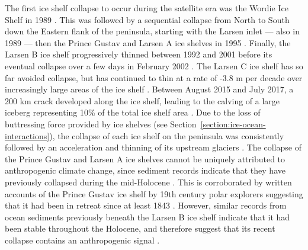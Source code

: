 The first ice shelf collapse to occur during the satellite era was the Wordie Ice Shelf in 1989 \citep{doakeRapidDisintegrationWordie1991}. This was followed by a sequential collapse from North to South down the Eastern flank of the peninsula, starting with the Larsen inlet --- also in 1989 --- then the Prince Gustav and Larsen A ice shelves in 1995 \citep{cookOverviewArealChanges2010}. Finally, the Larsen B ice shelf progressively thinned between 1992 and 2001 before its eventual collapse over a few days in February 2002 \citep{shepherdLarsenIceShelf2003}. The Larsen C ice shelf has so far avoided collapse, but has continued to thin at a rate of -3.8 m per decade over increasingly large areas of the ice shelf \citep{paoloVolumeLossAntarctic2015}. Between August 2015 and July 2017, a 200 km crack developed along the ice shelf, leading to the calving of a large iceberg representing 10\% of the total ice shelf area \citep{hoggImpactsLarsenCIce2017}. Due to the loss of buttressing force provided by ice shelves (see Section~\ref{section:ice-ocean-interactions}), the collapse of each ice shelf on the peninsula was consistently followed by an acceleration and thinning of its upstream glaciers \citep{rignotAcceleratedIceDischarge2004,glasserIceshelfTributaryTidewater2011,domgaardHalfCenturyDynamic2025}. The collapse of the Prince Gustav and Larsen A ice shelves cannot be uniquely attributed to anthropogenic climate change, since sediment records indicate that they have previously collapsed during the mid-Holocene \citep{pudseyFirstSurveyAntarctic2001,brachfeldHoloceneHistoryLarsenA2003}. This is corroborated by written accounts of the Prince Gustav ice shelf by 19th century polar explorers suggesting that it had been in retreat since at least 1843 \citep{cooperHistoricalObservationsPrince1997}. However, similar records from ocean sediments previously beneath the Larsen B ice shelf indicate that it had been stable throughout the Holocene, and therefore suggest that its recent collapse contains an anthropogenic signal \citep{domackStabilityLarsenIce2005}.


